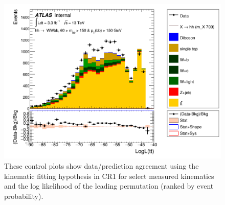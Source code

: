 \begin{figure}[!hb]
\begin{center}
                \includegraphics[width=.47\textwidth]{figures/kinFit_appendix/bbpt150/C_mBBcr_opt700_bbpt150_LogLikelihood_ttbar}
	\caption{These control plots show data/prediction agreement using the \ttbar kinematic fitting hypothesis in CR1 for select measured kinematics and the log likelihood of the leading permutation (ranked by event probability).}
	\label{fig:klfitter_control_plots_bbpt150}
	\end{center}    
	\end{figure}


